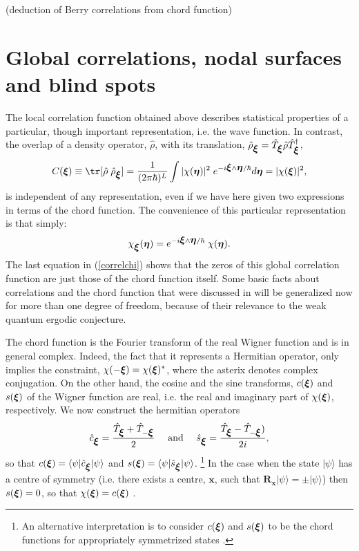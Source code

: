 \documentclass[12pt]{iopart}
\newcommand{\be}{\begin{equation}}
\newcommand{\ee}{\end{equation}}
\newcommand{\x}{{\mathbf x}}
\newcommand{\R}{{\mathbf R}}
\newcommand{\vct}[1]{\ensuremath\mbox{\boldmath$ #1 $}}
\newcommand{\Vxi}{\vct \xi}
\newcommand{\Veta}{\vct \eta}
\def\ro{\hat{\rho}}
\begin{document}
(deduction of Berry correlations from chord function)








\section{ Global correlations, nodal surfaces and blind spots}

The local correlation function obtained above describes statistical properties of a particular,
though important representation, i.e. the wave function. In contrast, the overlap of a density operator, $\ro$,
with its translation, $\ro_{\Vxi} = \hat T_{\Vxi}\ro\hat T^\dag_{\Vxi}$,
\begin{equation}
C(\Vxi)\equiv\tr [\ro \; \ro_{\Vxi}]=\frac{1}{(2\pi\hbar)^L}\int |\chi(\Veta)|^2 \; e^{-i\Vxi\wedge\Veta/\hbar}d\Veta
= |\chi(\Vxi)|^2,
\label{correlchi}
\end{equation}
is independent of any representation, even if we have here given two expressions in terms of the chord function.
The convenience of this particular representation is that simply:
\be
\chi_{\Vxi}(\Veta)= e^{-i\Vxi\wedge\Veta/\hbar} \; \chi(\Veta).
\label{transchord}
\ee
The last equation in (\ref{correlchi}) shows that the zeros of this global correlation function are just those of the chord function itself.
Some basic facts about correlations and the chord function that were discussed in \cite{ZOA10} 
will be generalized now for more than one degree of freedom, 
because of their relevance to the weak quantum ergodic conjecture.

The chord function  is the Fourier transform of the real Wigner function and is in general complex.
Indeed, the fact that it represents a Hermitian operator, only implies the constraint, 
$\chi(-\Vxi) = \chi(\Vxi)^*$, where the asterix denotes complex conjugation.
On the other hand, the cosine and the sine transforms, $c(\Vxi)$ and $s(\Vxi)$ of the Wigner function are real, 
i.e. the real and imaginary part of $\chi(\Vxi)$, respectively. 
We now construct the hermitian operators 
\begin{equation}
\hat c_{\Vxi} = \frac{\hat{T}_{\Vxi} + \hat{T}_{-\Vxi}}2
\quad\textrm{ and }\quad
\hat s_{\Vxi} = \frac{\hat{T}_{\Vxi} - \hat{T}_{-\Vxi})}{2i},
\end{equation} so that 
$c(\Vxi) = \langle\psi|\hat c_{\Vxi}|\psi\rangle$  and
$s(\Vxi) = \langle\psi|\hat s_{\Vxi}|\psi\rangle$.
\footnote{ An alternative interpretation is to consider $c(\Vxi)$ and $s(\Vxi)$
to be the chord functions for appropriately symmetrized states \cite{Blind}.} 
In the case when the state $|\psi\rangle$ has a centre of symmetry
(i.e. there exists a centre, $\x$, such that $\R_{\x}|\psi\rangle = \pm |\psi\rangle$)
then $s(\Vxi)=0$, so that $\chi(\Vxi)=c(\Vxi)$ \cite{OVS, Blind}. 
\end{document}
